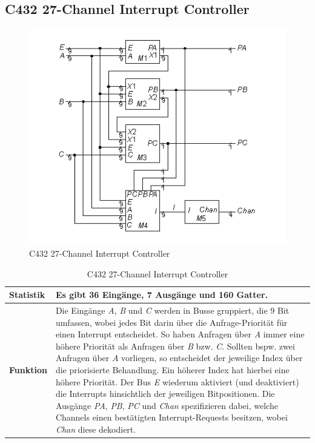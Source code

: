 \subsection*{C432 27-Channel Interrupt Controller}
\label{sec:c432}
\begin{figure}[bth]
	\centering
	\includegraphics[scale=0.7]{./img/c432}
	\caption[C432 27-Channel Interrupt Controller]{C432 27-Channel Interrupt Controller \cite{h1999}}
	\label{fig:c432}
\end{figure}
\begin{table}[bth]
	\centering
	\caption{C432 27-Channel Interrupt Controller}
	\label{tab:c432}
	\begin{tabular}{ | p{2cm} | p{12cm} |}
		\hline
		\textbf{Statistik} & Es gibt 36 Eingänge, 7 Ausgänge und 160 Gatter. \\\hline
		\textbf{Funktion} & Die Eingänge \emph{A}, \emph{B} und \emph{C} werden in Busse gruppiert, die 9 Bit umfassen, wobei jedes Bit darin über die Anfrage-Priorität für einen Interrupt entscheidet. So haben Anfragen über \emph{A} immer eine höhere Priorität als Anfragen über \emph{B} bzw. \emph{C}. Sollten bspw. zwei Anfragen über $A$ vorliegen, so entscheidet der jeweilige Index über die priorisierte Behandlung. Ein höherer Index hat hierbei eine höhere Priorität. Der Bus \emph{E} wiederum aktiviert (und deaktiviert) die Interrupts hinsichtlich der jeweiligen Bitpositionen. Die Ausgänge \emph{PA}, \emph{PB}, \emph{PC} und \emph{Chan} spezifizieren dabei, welche Channels einen bestätigten Interrupt-Requests besitzen, wobei \emph{Chan} diese dekodiert.\\\hline
	\end{tabular}
\end{table}
\newpage
